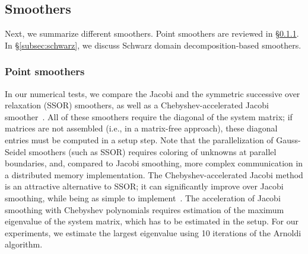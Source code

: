 \documentclass[smallcondensed,final]{svjour3}     %
\begin{document}




\subsection{Smoothers}\label{subsec:smoothers}
Next, we summarize different smoothers. Point smoothers are reviewed
in \S\ref{subsec:ptsmoothers}. In \S\ref{subsec:schwarz}, we discuss
Schwarz domain decomposition-based smoothers.


\subsubsection{Point smoothers}\label{subsec:ptsmoothers}
In our numerical tests, we compare the Jacobi and the symmetric successive over
relaxation (SSOR) smoothers, as well as a Chebyshev-accelerated Jacobi
smoother~\cite{Brandt77}. All of these smoothers require the diagonal of the
system matrix; if matrices are not assembled (i.e., in a matrix-free approach),
these diagonal entries must be computed in a setup step.  Note that the
parallelization of Gauss-Seidel smoothers (such as SSOR) requires coloring of
unknowns at parallel boundaries, and, compared to Jacobi smoothing, more
complex communication in a distributed memory implementation. The
Chebyshev-accelerated Jacobi method is an attractive alternative to SSOR; it
can significantly improve over Jacobi smoothing, while being as simple to
implement~\cite{AdamsBrezinaHuEtAl03}. The acceleration of Jacobi smoothing
with Chebyshev polynomials requires estimation of the maximum eigenvalue of
the system matrix, which has to be estimated in the setup. For our experiments, we
estimate the largest eigenvalue using 10 iterations of the Arnoldi algorithm.
\end{document}
